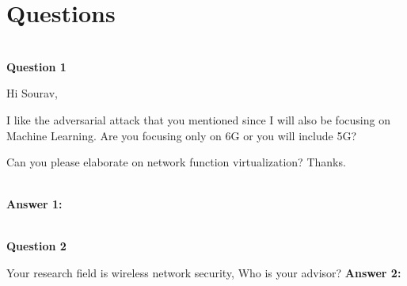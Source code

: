 \documentclass[journal]{IEEEtran}
\begin{document}
\section{Questions}
\\
\textbf{Question 1}

Hi Sourav,

I like the adversarial attack that you mentioned since I will also be focusing on Machine Learning. Are you focusing only on 6G or you will include 5G?


Can you please elaborate on network function virtualization? Thanks.

\\
\textbf{Answer 1:}


\\
\textbf{Question 2}

Your research field is wireless network security, Who is your advisor?
\textbf{Answer 2:}
\end{document}
